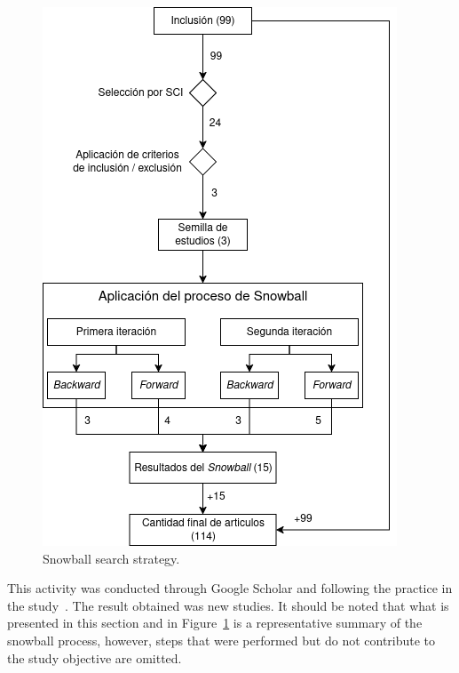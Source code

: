 \begin{figure}[htbp]
	\centering
	\includegraphics[scale=0.55]{resources/figures/sms-Snowball.drawio.png}
	\caption{Snowball search strategy.}
	\label{figure:Snowball}
\end{figure}

This activity was conducted through Google Scholar and following the practice in the study~\cite{Ali-01}. The result obtained was \snowballNewStudies{} new studies. It should be noted that what is presented in this section and in Figure~\ref{figure:Snowball} is a representative summary of the snowball process, however, steps that were performed but do not contribute to the study objective are omitted.

